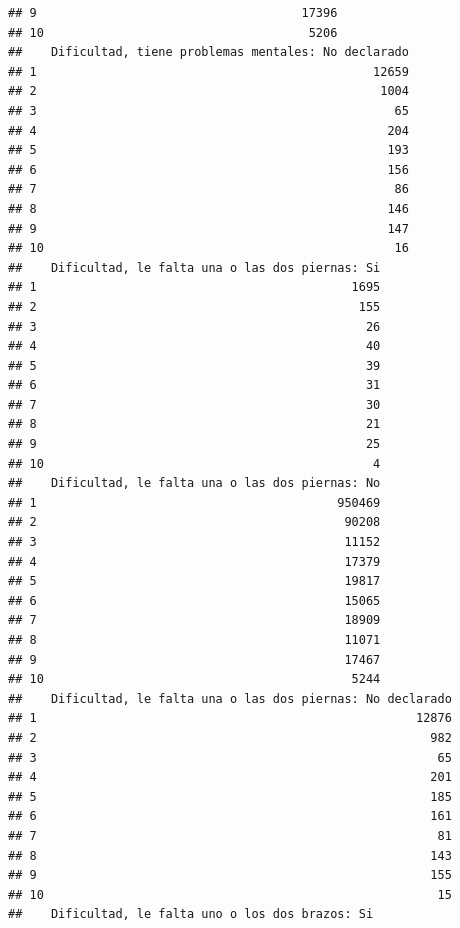 \documentclass[11pt,]{article}
\begin{document}
\begin{verbatim}
## 9                                     17396
## 10                                     5206
##    Dificultad, tiene problemas mentales: No declarado
## 1                                               12659
## 2                                                1004
## 3                                                  65
## 4                                                 204
## 5                                                 193
## 6                                                 156
## 7                                                  86
## 8                                                 146
## 9                                                 147
## 10                                                 16
##    Dificultad, le falta una o las dos piernas: Si
## 1                                            1695
## 2                                             155
## 3                                              26
## 4                                              40
## 5                                              39
## 6                                              31
## 7                                              30
## 8                                              21
## 9                                              25
## 10                                              4
##    Dificultad, le falta una o las dos piernas: No
## 1                                          950469
## 2                                           90208
## 3                                           11152
## 4                                           17379
## 5                                           19817
## 6                                           15065
## 7                                           18909
## 8                                           11071
## 9                                           17467
## 10                                           5244
##    Dificultad, le falta una o las dos piernas: No declarado
## 1                                                     12876
## 2                                                       982
## 3                                                        65
## 4                                                       201
## 5                                                       185
## 6                                                       161
## 7                                                        81
## 8                                                       143
## 9                                                       155
## 10                                                       15
##    Dificultad, le falta uno o los dos brazos: Si

\end{verbatim}
\end{document}
